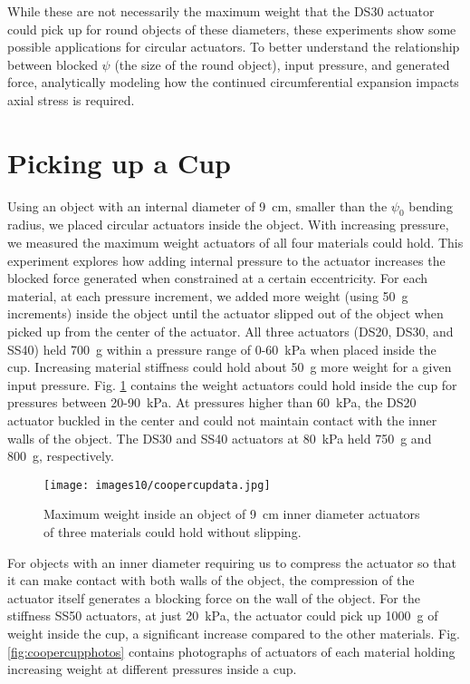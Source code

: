 While these are not necessarily the maximum weight that the DS30 actuator could pick up for round objects of these diameters, these experiments show some possible applications for circular actuators. To better understand the relationship between blocked $\psi$ (the size of the round object), input pressure, and generated force, analytically modeling how the continued circumferential expansion impacts axial stress is required. 

\section{Picking up a Cup}

Using an object with an internal diameter of 9~cm, smaller than the $\psi_0$ bending radius, we placed circular actuators inside the object. With increasing pressure, we measured the maximum weight actuators of all four materials could hold. This experiment explores how adding internal pressure to the actuator increases the blocked force generated when constrained at a certain eccentricity. For each material, at each pressure increment, we added more weight (using 50~g increments) inside the object until the actuator slipped out of the object when picked up from the center of the actuator. All three actuators (DS20, DS30, and SS40) held 700~g within a pressure range of 0-60~kPa when placed inside the cup. Increasing material stiffness could hold about 50~g more weight for a given input pressure. Fig. \ref{fig:coopercupdata} contains the weight actuators could hold inside the cup for pressures between 20-90~kPa. At pressures higher than 60~kPa, the DS20 actuator buckled in the center and could not maintain contact with the inner walls of the object. The DS30 and SS40 actuators at 80~kPa held 750~g and 800~g, respectively. 

\begin{figure}[ht]
    \centering
     \texttt{[image: images10/coopercupdata.jpg]}
    \caption{Maximum weight inside an object of 9~cm inner diameter actuators of three materials could hold without slipping.}
    \label{fig:coopercupdata}
\end{figure}

For objects with an inner diameter requiring us to compress the actuator so that it can make contact with both walls of the object, the compression of the actuator itself generates a blocking force on the wall of the object. For the stiffness SS50 actuators, at just 20~kPa, the actuator could pick up 1000~g of weight inside the cup, a significant increase compared to the other materials. Fig. \ref{fig:coopercupphotos} contains photographs of actuators of each material holding increasing weight at different pressures inside a cup. 

